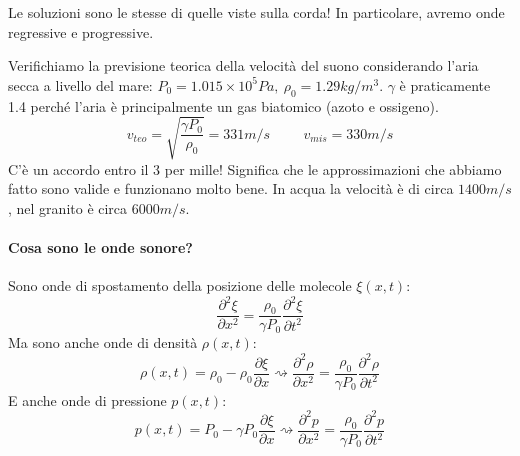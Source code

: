 Le soluzioni sono le stesse di quelle viste sulla corda! In particolare, avremo onde regressive e progressive.
\begin{eg}
	Verifichiamo la previsione teorica della velocità del suono considerando l'aria secca a livello del mare: \(P_0 = 1.015 \times 10^5 \unit{Pa},\ \rho _0 = 1.29 \unit{kg/ m^3 }\). \(\gamma \) è praticamente 1.4 perché l'aria è principalmente un gas biatomico (azoto e ossigeno).
	\begin{equation}
		v_{teo} = \sqrt{\frac{\gamma P_0}{\rho _0}} = 331 \unit{m/s} \hspace{1cm} v_{mis} = 330 \unit{m / s} 
	\end{equation}
	C'è un accordo entro il 3 per mille! Significa che le approssimazioni che abbiamo fatto sono valide e funzionano molto bene. In acqua la velocità è di circa \(1400 \unit{m / s}\), nel granito è circa \(6000 \unit{m /s}\).
\end{eg}

\paragraph{Cosa sono le onde sonore?}
Sono onde di spostamento della posizione delle molecole \(\xi (x,t)\):
\begin{equation}
	\frac{\partial^{2}  \xi }{\partial x^{2} } = \frac{\rho _0}{\gamma P_0} \frac{\partial ^{2} \xi }{\partial t ^{2} }  
\end{equation}
Ma sono anche onde di densità \(\rho (x,t)\):
\begin{equation}
	\rho (x,t) = \rho _0 - \rho _0 \frac{\partial \xi }{\partial x} \rightsquigarrow \frac{\partial ^{2} \rho }{\partial x^{2} } = \frac{\rho _0}{\gamma P_0} \frac{\partial ^{2} \rho }{\partial t ^{2} }  
\end{equation}
E anche onde di pressione \(p(x,t)\):
\begin{equation}
	p(x,t) = P_0 - \gamma P_0 \frac{\partial \xi }{\partial x} \rightsquigarrow \frac{\partial ^{2} p}{\partial x^{2} } = \frac{\rho _0}{\gamma P_0} \frac{\partial ^{2} p}{\partial t ^{2} }  
\end{equation}
